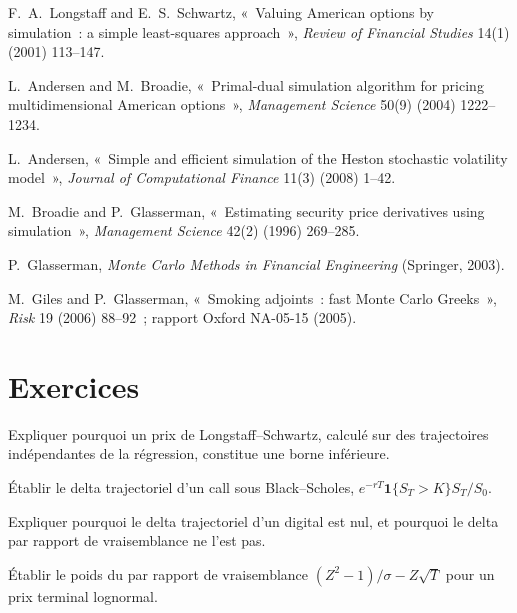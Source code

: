 \begin{omsources}
\item F.~A.~Longstaff and E.~S.~Schwartz, «~Valuing American options by simulation~: a simple least-squares approach~», \emph{Review of Financial Studies}
14(1) (2001) 113--147.
\item L.~Andersen and M.~Broadie, «~Primal-dual simulation algorithm for pricing multidimensional American options~», \emph{Management Science} 50(9)
(2004) 1222--1234.
\item L.~Andersen, «~Simple and efficient simulation of the Heston stochastic volatility model~», \emph{Journal of Computational Finance} 11(3) (2008) 1--42.
\item M.~Broadie and P.~Glasserman, «~Estimating security price derivatives using simulation~», \emph{Management Science} 42(2) (1996) 269--285.
\item P.~Glasserman, \emph{Monte Carlo Methods in Financial Engineering} (Springer, 2003).
\item M.~Giles and P.~Glasserman, «~Smoking adjoints~: fast Monte Carlo Greeks~», \emph{Risk} 19 (2006) 88--92~; rapport Oxford NA-05-15 (2005).
\end{omsources}

\section{Exercices}

\begin{exercise}[$\star$]\label{exo:dv:monte-carlo-pricers-in-practice:1}
Expliquer pourquoi un prix de Longstaff--Schwartz, calculé sur des trajectoires indépendantes de la régression, constitue une borne inférieure.
\end{exercise}

\begin{exercise}[$\star$]\label{exo:dv:monte-carlo-pricers-in-practice:2}
Établir le delta trajectoriel d'un call sous Black--Scholes, $e^{-rT}\mathbf 1\{S_T>K\}S_T/S_0$.
\end{exercise}

\begin{exercise}[$\star$]\label{exo:dv:monte-carlo-pricers-in-practice:3}
Expliquer pourquoi le delta trajectoriel d'un digital est nul, et pourquoi le delta par rapport de vraisemblance ne l'est pas.
\end{exercise}

\begin{exercise}[$\star\star$]\label{exo:dv:monte-carlo-pricers-in-practice:4}
Établir le poids du  par rapport de vraisemblance $(Z^2-1)/\sigma-Z\sqrt T$ pour un prix terminal lognormal.
\end{exercise}

